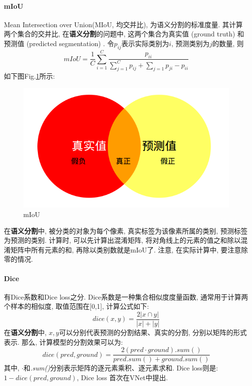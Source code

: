 \paragraph{mIoU}
Mean Intersection over Union(MIoU, 均交并比), 为语义分割的标准度量. 其计算两个集合的交并比, 在\textbf{语义分割}的问题中, 这两个集合为真实值 (ground truth) 和预测值 (predicted segmentation) . 令$p_{ij}$表示实际类别为$i$, 预测类别为$j$的数量, 则
$$
mIoU = \frac{1}{C} \sum_{i=1}^{C} \frac{p_{ii}}{ \sum_{j=1}^{C} p_{ij} + \sum_{j=1} p_{ji} - p_{ii} }
$$
如下图Fig.\ref{fig:miou}所示: 
\begin{figure}[h]
	\centering
	\includegraphics[width=.6\textwidth]{pics/miou.png}
	\caption{mIoU}
	\label{fig:miou}
\end{figure}
在\textbf{语义分割}中, 被分类的对象为每个像素, 真实标签为该像素所属的类别, 预测标签为预测的类别. 计算时, 可以先计算出混淆矩阵, 将对角线上的元素的值之和除以混淆矩阵中所有元素的和, 再除以类别数就是mIoU了. 注意, 在实际计算中, 要注意除零的情况. 

\paragraph{Dice}
有Dice系数和Dice loss之分. 
Dice系数是一种集合相似度度量函数, 通常用于计算两个样本的相似度, 取值范围在[0,1], 计算公式如下: 
$$
dice(x, y) = \frac{2|x \cap y|}{|x| + |y|}
$$
在\textbf{语义分割}中, $x, y$可以分别代表预测的分割结果、真实的分割, 分别以矩阵的形式表示. 那么, 计算模型的分割效果可以为: 
$$
dice(pred, ground) = \frac{2(pred \cdot ground).sum()}{pred.sum() + ground.sum()}
$$
其中, $\cdot$和\textit{.sum()}分别表示矩阵的逐元素乘积、逐元素求和. 
Dice loss则是: $1 - dice(pred, ground)$, Dice loss 首次在VNet中提出. 

